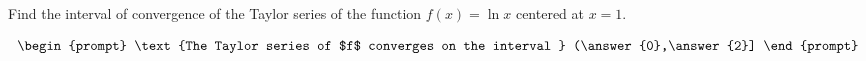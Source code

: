 \documentclass{ximera}
\author{Gregory Hartman \and Matthew Carr}
\begin{document}
\begin{exercise}






Find the interval of convergence of the Taylor series of the function $f(x)=\ln x$ centered at $x=1$.

\[
\begin{prompt}
\text{The Taylor series of $f$ converges on the interval } (\answer{0},\answer{2}]
\end{prompt}
\]

\end{exercise}
\end{document}
